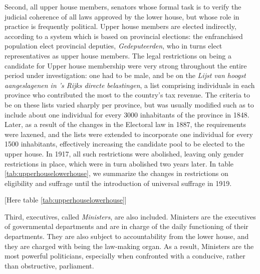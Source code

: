     Second, all upper house members, senators whose formal task is to verify the judicial coherence of all laws approved by the lower house, but whose role in practice is frequently political.\autocite{van1999eerste} Upper house members are elected indirectly, according to a system which is based on provincial elections: the enfranchised population elect provincial deputies, \textit{Gedeputeerden}, who in turns elect representatives as upper house members. The legal restrictions on being a candidate for Upper house membership were very strong throughout the entire period under investigation: one had to be male, and be on the \textit{Lijst van hoogst aangeslagenen in 's Rijks directe belastingen}, a list comprising individuals in each province who contributed the most to the country's tax revenue. \autocite{moes1994lijsten} The criteria to be on these lists varied sharply per province, but was usually modified such as to include about one individual for every 3000 inhabitants of the province in 1848. \autocite{moes2012onder} Later, as a result of the changes in the Electoral law in 1887, the requirements were laxened, and the lists were extended to incorporate one individual for every 1500 inhabitants, effectively increasing the candidate pool to be elected to the upper house. In 1917, all such restrictions were abolished, leaving only gender restrictions in place, which were in turn abolished two years later. In table \ref{tab:upperhouselowerhouse}, we summarize the changes in restrictions on eligibility and suffrage until the introduction of universal suffrage in 1919. 
    
    \begin{center}
        [Here table \ref{tab:upperhouselowerhouse}]
    \end{center}

    Third, executives, called \textit{Ministers}, are also included. Ministers are the executives of governmental departments and are in charge of the daily functioning of their departments. They are also subject to accountability from the lower house, and they are charged with being the law-making organ. \autocite{secker1991ministers} As a result, Ministers are the most powerful politicians, especially when confronted with a conducive, rather than obstructive, parliament. \autocite[16]{bosmans2011parlementaire}

